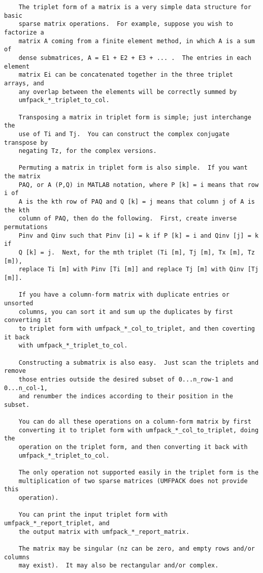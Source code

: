 {\begin{verbatim}
    The triplet form of a matrix is a very simple data structure for basic
    sparse matrix operations.  For example, suppose you wish to factorize a
    matrix A coming from a finite element method, in which A is a sum of
    dense submatrices, A = E1 + E2 + E3 + ... .  The entries in each element
    matrix Ei can be concatenated together in the three triplet arrays, and
    any overlap between the elements will be correctly summed by
    umfpack_*_triplet_to_col.

    Transposing a matrix in triplet form is simple; just interchange the
    use of Ti and Tj.  You can construct the complex conjugate transpose by
    negating Tz, for the complex versions.

    Permuting a matrix in triplet form is also simple.  If you want the matrix
    PAQ, or A (P,Q) in MATLAB notation, where P [k] = i means that row i of
    A is the kth row of PAQ and Q [k] = j means that column j of A is the kth
    column of PAQ, then do the following.  First, create inverse permutations
    Pinv and Qinv such that Pinv [i] = k if P [k] = i and Qinv [j] = k if
    Q [k] = j.  Next, for the mth triplet (Ti [m], Tj [m], Tx [m], Tz [m]),
    replace Ti [m] with Pinv [Ti [m]] and replace Tj [m] with Qinv [Tj [m]].

    If you have a column-form matrix with duplicate entries or unsorted
    columns, you can sort it and sum up the duplicates by first converting it
    to triplet form with umfpack_*_col_to_triplet, and then coverting it back
    with umfpack_*_triplet_to_col.

    Constructing a submatrix is also easy.  Just scan the triplets and remove
    those entries outside the desired subset of 0...n_row-1 and 0...n_col-1,
    and renumber the indices according to their position in the subset.

    You can do all these operations on a column-form matrix by first
    converting it to triplet form with umfpack_*_col_to_triplet, doing the
    operation on the triplet form, and then converting it back with
    umfpack_*_triplet_to_col.

    The only operation not supported easily in the triplet form is the
    multiplication of two sparse matrices (UMFPACK does not provide this
    operation).

    You can print the input triplet form with umfpack_*_report_triplet, and
    the output matrix with umfpack_*_report_matrix.

    The matrix may be singular (nz can be zero, and empty rows and/or columns
    may exist).  It may also be rectangular and/or complex.


\end{verbatim}}
